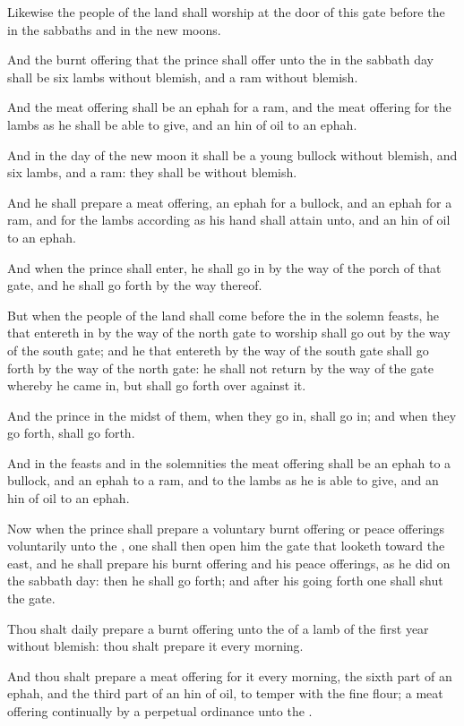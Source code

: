 \Verse Likewise the people of the land shall worship at the door of this gate before the \LORD in the sabbaths and in the new moons.

\Verse And the burnt offering that the prince shall offer unto the \LORD in the sabbath day shall be six lambs without blemish, and a ram without blemish.

\Verse And the meat offering shall be an ephah for a ram, and the meat offering for the lambs as he shall be able to give, and an hin of oil to an ephah.

\Verse And in the day of the new moon it shall be a young bullock without blemish, and six lambs, and a ram: they shall be without blemish.

\Verse And he shall prepare a meat offering, an ephah for a bullock, and an ephah for a ram, and for the lambs according as his hand shall attain unto, and an hin of oil to an ephah.

\Verse And when the prince shall enter, he shall go in by the way of the porch of that gate, and he shall go forth by the way thereof.

\Verse But when the people of the land shall come before the \LORD in the solemn feasts, he that entereth in by the way of the north gate to worship shall go out by the way of the south gate; and he that entereth by the way of the south gate shall go forth by the way of the north gate: he shall not return by the way of the gate whereby he came in, but shall go forth over against it.

\Verse And the prince in the midst of them, when they go in, shall go in; and when they go forth, shall go forth.

\Verse And in the feasts and in the solemnities the meat offering shall be an ephah to a bullock, and an ephah to a ram, and to the lambs as he is able to give, and an hin of oil to an ephah.

\Verse Now when the prince shall prepare a voluntary burnt offering or peace offerings voluntarily unto the \LORD, one shall then open him the gate that looketh toward the east, and he shall prepare his burnt offering and his peace offerings, as he did on the sabbath day: then he shall go forth; and after his going forth one shall shut the gate.

\Verse Thou shalt daily prepare a burnt offering unto the \LORD of a lamb of the first year without blemish: thou shalt prepare it every morning.

\Verse And thou shalt prepare a meat offering for it every morning, the sixth part of an ephah, and the third part of an hin of oil, to temper with the fine flour; a meat offering continually by a perpetual ordinance unto the \LORD.

